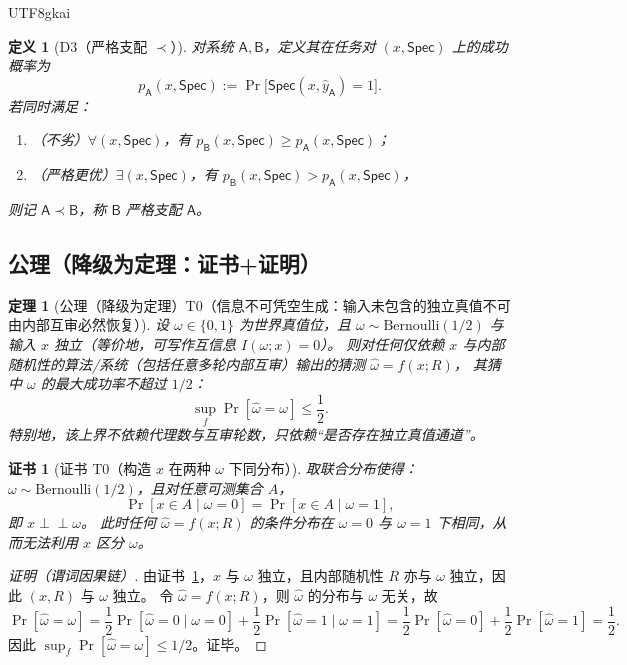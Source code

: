 \documentclass[12pt]{article}
\newtheorem{definition}{定义}[section]
\newtheorem{theorem}{定理}[section]
\newtheorem{Certificate}{证书}[section]
\begin{document}
\begin{CJK*}{UTF8}{gkai}
\begin{definition}[D3（严格支配 $\prec$）]
\label{def:tex27-ch18-d3}
对系统 $\mathsf{A},\mathsf{B}$，定义其在任务对 $(x,\mathsf{Spec})$ 上的成功概率为
\[
  p_{\mathsf{A}}(x,\mathsf{Spec}) := \Pr\bigl[\mathsf{Spec}(x,\hat y_{\mathsf{A}})=1\bigr].
\]
若同时满足：
\begin{enumerate}
  \item（不劣）$\forall(x,\mathsf{Spec})$，有 $p_{\mathsf{B}}(x,\mathsf{Spec})\ge p_{\mathsf{A}}(x,\mathsf{Spec})$；
  \item（严格更优）$\exists(x,\mathsf{Spec})$，有 $p_{\mathsf{B}}(x,\mathsf{Spec})> p_{\mathsf{A}}(x,\mathsf{Spec})$，
\end{enumerate}
则记 $\mathsf{A}\prec \mathsf{B}$，称 $\mathsf{B}$ 严格支配 $\mathsf{A}$。
\end{definition}

\subsection{公理（降级为定理：证书+证明）}
\label{subsec:tex27-ch18-axiom-as-theorem}

\begin{theorem}[公理（降级为定理）T0（信息不可凭空生成：输入未包含的独立真值不可由内部互审必然恢复）]
\label{thm:tex27-ch18-t0}
设 $\omega\in\{0,1\}$ 为世界真值位，且 $\omega\sim \mathrm{Bernoulli}(1/2)$ 与输入 $x$ 独立（等价地，可写作互信息 $I(\omega;x)=0$）。
则对任何仅依赖 $x$ 与内部随机性的算法/系统（包括任意多轮内部互审）输出的猜测 $\hat\omega=f(x;R)$，
其猜中 $\omega$ 的最大成功率不超过 $1/2$：
\[
  \sup_{f}\Pr[\hat\omega=\omega]\le \frac12.
\]
特别地，该上界不依赖代理数与互审轮数，只依赖“是否存在独立真值通道”。
\end{theorem}

\begin{Certificate}[证书 T0（构造 $x$ 在两种 $\omega$ 下同分布）]
\label{cert:tex27-ch18-t0}
取联合分布使得：$\omega\sim \mathrm{Bernoulli}(1/2)$，且对任意可测集合 $A$，
\[
  \Pr[x\in A\mid \omega=0]=\Pr[x\in A\mid \omega=1],
\]
即 $x\perp\!\!\!\perp \omega$。
此时任何 $\hat\omega=f(x;R)$ 的条件分布在 $\omega=0$ 与 $\omega=1$ 下相同，从而无法利用 $x$ 区分 $\omega$。
\end{Certificate}

\begin{proof}[证明（谓词因果链）]
由证书~\ref{cert:tex27-ch18-t0}，$x$ 与 $\omega$ 独立，且内部随机性 $R$ 亦与 $\omega$ 独立，因此 $(x,R)$ 与 $\omega$ 独立。
令 $\hat\omega=f(x;R)$，则 $\hat\omega$ 的分布与 $\omega$ 无关，故
\[
  \Pr[\hat\omega=\omega]
  =\frac12\Pr[\hat\omega=0\mid\omega=0]+\frac12\Pr[\hat\omega=1\mid\omega=1]
  =\frac12\Pr[\hat\omega=0]+\frac12\Pr[\hat\omega=1]
  =\frac12.
\]
因此 $\sup_f \Pr[\hat\omega=\omega]\le 1/2$。证毕。
\end{proof}


\end{CJK*}
\end{document}

